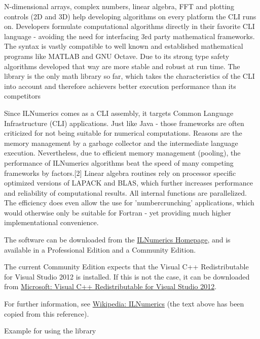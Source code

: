 	\vpara
	N-dimensional arrays, complex numbers, linear algebra, FFT and plotting controls (2D and 3D) help developing algorithms on every platform the CLI runs on. Developers formulate computational algorithms directly in their favorite CLI language - avoiding the need for interfacing 3rd party mathematical frameworks. The syntax is vastly compatible to well known and established mathematical programs like MATLAB and GNU Octave. Due to its strong type safety algorithms developed that way are more stable and robust at run time. The library is the only math library so far, which takes the characteristics of the CLI into account and therefore achievers better execution performance than its competitors
	
	\vpara
	Since ILNumerics comes as a CLI assembly, it targets Common Language Infrastructure (CLI) applications. Just like Java - those frameworks are often criticized for not being suitable for numerical computations. Reasons are the memory management by a garbage collector and the intermediate language execution. Nevertheless, due to efficient memory management (pooling), the performance of ILNumerics algorithms beat the speed of many competing frameworks by factors.[2] Linear algebra routines rely on processor specific optimized versions of LAPACK and BLAS, which further increases performance and reliability of computational results. All internal functions are parallelized. The efficiency does even allow the use for 'numbercrunching' applications, which would otherwise only be suitable for Fortran - yet providing much higher implementational convenience.
	
	The software can be downloaded from the \href{http://ilnumerics.net/GetStarted.html}{ILNumerics Homepage}, and is available in a Professional Edition and a Community Edition.
	
	The current Community Edition expects  that the Visual C++ Redistributable for Visual Studio 2012 is installed. If this is not the case, it can be downloaded from  \href{http://www.microsoft.com/en-us/download/details.aspx?id=30679}{Microsoft: Visual C++ Redistributable for Visual Studio 2012}.
	
	For further information, see \href{http://en.wikipedia.org/wiki/ILNumerics.Net}{Wikipedia: ILNumerics} (the text above has been copied from this reference).
	
	\vpara
	Example for using the library
	
